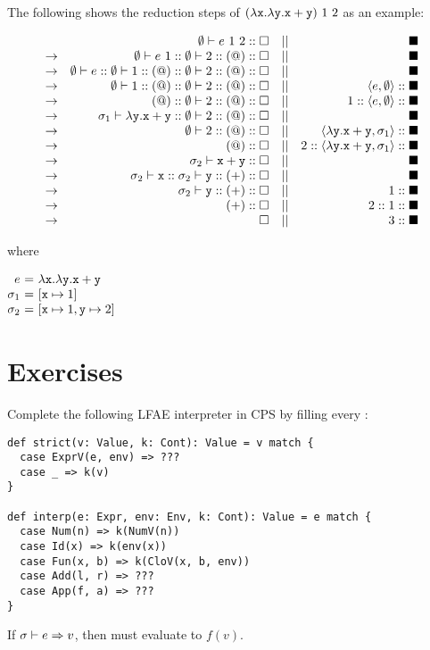 The following shows the reduction steps of
$(\lambda\texttt{x}.\lambda\texttt{y}.\texttt{x}+\texttt{y})\ 1\ 2$ as an example:

\[
\begin{array}{lrcr}
              & \emptyset\vdash e\ 1\ 2:: \square &||& \blacksquare \\
  \rightarrow & \emptyset\vdash e\ 1:: \emptyset\vdash2:: (@):: \square &||& \blacksquare \\
  \rightarrow & \emptyset\vdash e:: \emptyset\vdash1:: (@):: \emptyset\vdash2:: (@):: \square &||& \blacksquare \\
  \rightarrow & \emptyset\vdash1:: (@):: \emptyset\vdash2:: (@):: \square &||& \langle e,\emptyset\rangle::\blacksquare \\
  \rightarrow & (@):: \emptyset\vdash2:: (@):: \square &||& 1::\langle e,\emptyset\rangle::\blacksquare \\
  \rightarrow & \sigma_1\vdash\lambda \texttt{y}.\texttt{x}+\texttt{y}:: \emptyset\vdash2:: (@):: \square &||& \blacksquare \\
  \rightarrow & \emptyset\vdash2:: (@):: \square &||& \langle\lambda\texttt{y}.\texttt{x}+\texttt{y},\sigma_1\rangle::\blacksquare \\
  \rightarrow & (@):: \square &||& 2::\langle\lambda\texttt{y}.\texttt{x}+\texttt{y},\sigma_1\rangle::\blacksquare \\
  \rightarrow & \sigma_2\vdash\texttt{x}+\texttt{y}:: \square &||& \blacksquare \\
  \rightarrow & \sigma_2\vdash\texttt{x}:: \sigma_2\vdash\texttt{y}:: (+):: \square &||& \blacksquare \\
  \rightarrow & \sigma_2\vdash\texttt{y}:: (+):: \square &||& 1::\blacksquare \\
  \rightarrow & (+):: \square &||& 2::1::\blacksquare \\
  \rightarrow & \square &||& 3::\blacksquare \\
\end{array}
\]

where

$
\begin{array}{@{}r@{~}c@{~}l}
  e&=&\efun{\cx}{\efun{\cy}{\cx+\cy}}\\
  \sigma_1&=&[\cx\mapsto1]\\
  \sigma_2&=&[\cx\mapsto1,\cy\mapsto2]\\
\end{array}
$

\section{Exercises}

\begin{exercise}

Complete the following \textsf{LFAE} interpreter in CPS by filling every
  :

\begin{verbatim}
def strict(v: Value, k: Cont): Value = v match {
  case ExprV(e, env) => ???
  case _ => k(v)
}

def interp(e: Expr, env: Env, k: Cont): Value = e match {
  case Num(n) => k(NumV(n))
  case Id(x) => k(env(x))
  case Fun(x, b) => k(CloV(x, b, env))
  case Add(l, r) => ???
  case App(f, a) => ???
}
\end{verbatim}

If $\sigma\vdash e\Rightarrow v$, then  must evaluate to $f(v)$.

\end{exercise}
